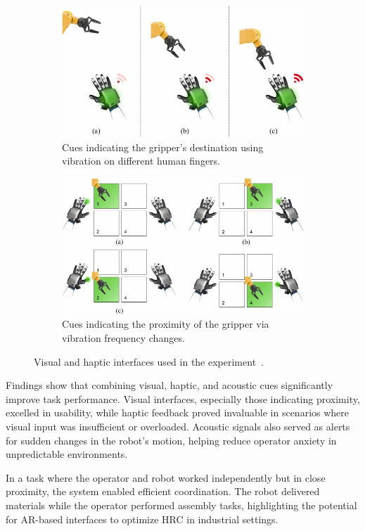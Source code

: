 \begin{figure}[htp]
    \centering
    \begin{subfigure}{\textwidth}
        \centering
        \includegraphics[width=0.6\linewidth]{figs/haptic-cues.jpg}
        \caption{Cues indicating the gripper’s destination using vibration on different human fingers.}
        \label{fig:sfig1}
    \end{subfigure}

    \vspace{0.5cm} %
    
    \begin{subfigure}{\textwidth}
        \centering
        \includegraphics[width=0.6\linewidth]{figs/visual-cues.jpg}
        \caption{Cues indicating the proximity of the gripper via vibration frequency changes.}
        \label{fig:sfig2}
    \end{subfigure}
    
    \caption{Visual and haptic interfaces used in the experiment~\cite{CHU2023313}.}
    \label{fig:haptic-visual-cues}
\end{figure}


Findings show that combining visual, haptic, and acoustic cues significantly improve task performance. Visual interfaces, especially those indicating proximity, excelled in usability, while haptic feedback proved invaluable in scenarios where visual input was insufficient or overloaded. Acoustic signals also served as alerts for sudden changes in the robot's motion, helping reduce operator anxiety in unpredictable environments.

In a task where the operator and robot worked independently but in close proximity, the system enabled efficient coordination. The robot delivered materials while the operator performed assembly tasks, highlighting the potential for \ac{AR}-based interfaces to optimize \ac{HRC} in industrial settings.

